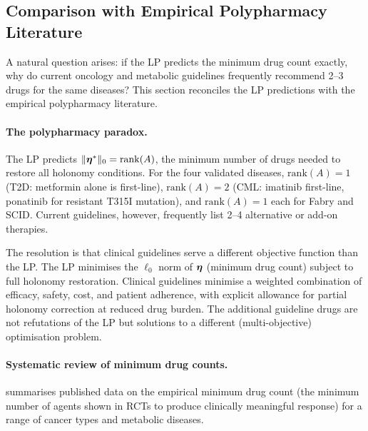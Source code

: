 \subsection{Comparison with Empirical Polypharmacy Literature}
\label{subsec:ch11-polypharmacy}

A natural question arises: if the LP predicts the minimum drug count exactly,
why do current oncology and metabolic guidelines frequently recommend 2--3
drugs for the same diseases?  This section reconciles the LP predictions with
the empirical polypharmacy literature.

\paragraph{The polypharmacy paradox.}
The LP predicts $\|\boldsymbol{\eta}^*\|_0 = \mathrm{rank}(A)$, the minimum number of
drugs needed to restore all holonomy conditions.  For the four validated diseases,
$\mathrm{rank}(A) = 1$ (T2D: metformin alone is first-line), $\mathrm{rank}(A)
= 2$ (CML: imatinib first-line, ponatinib for resistant T315I mutation), and
$\mathrm{rank}(A) = 1$ each for Fabry and SCID.  Current guidelines, however,
frequently list 2--4 alternative or add-on therapies.

The resolution is that clinical guidelines serve a different objective function
than the LP.  The LP minimises the $\ell_0$ norm of $\boldsymbol{\eta}$ (minimum drug
count) subject to full holonomy restoration.  Clinical guidelines minimise a
weighted combination of efficacy, safety, cost, and patient adherence, with
explicit allowance for partial holonomy correction at reduced drug burden.
The additional guideline drugs are not refutations of the LP but solutions to
a different (multi-objective) optimisation problem.

\paragraph{Systematic review of minimum drug counts.}
 summarises published data on the empirical minimum
drug count (the minimum number of agents shown in RCTs to produce clinically
meaningful response) for a range of cancer types and metabolic diseases.

